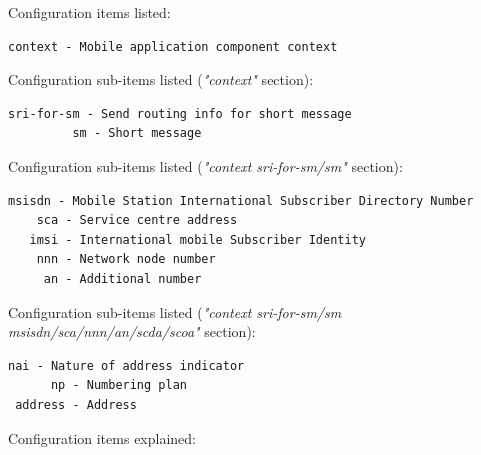 \documentclass[a4paper,latin]{paper}
\begin{document}
\noindent{}Configuration items listed:
\begin{lstlisting}[style=BashInputStyle, belowskip=\baselineskip]
 context - Mobile application component context
\end{lstlisting}
\noindent{}Configuration sub-items listed (\textit{"context"} section):
\begin{lstlisting}[style=BashInputStyle, belowskip=\baselineskip]
 sri-for-sm - Send routing info for short message
         sm - Short message
\end{lstlisting}
\noindent{}Configuration sub-items listed (\textit{"context sri-for-sm/sm"} section):
\begin{lstlisting}[style=BashInputStyle, belowskip=\baselineskip]
 msisdn - Mobile Station International Subscriber Directory Number
    sca - Service centre address                                  
   imsi - International mobile Subscriber Identity
    nnn - Network node number                     
     an - Additional number
\end{lstlisting}
\noindent{}Configuration sub-items listed (\textit{"context sri-for-sm/sm msisdn/sca/nnn/an/scda/scoa"} section):
\begin{lstlisting}[style=BashInputStyle, belowskip=\baselineskip]
     nai - Nature of address indicator
      np - Numbering plan            
 address - Address
\end{lstlisting}
\noindent{}Configuration items explained:\\
\end{document}
